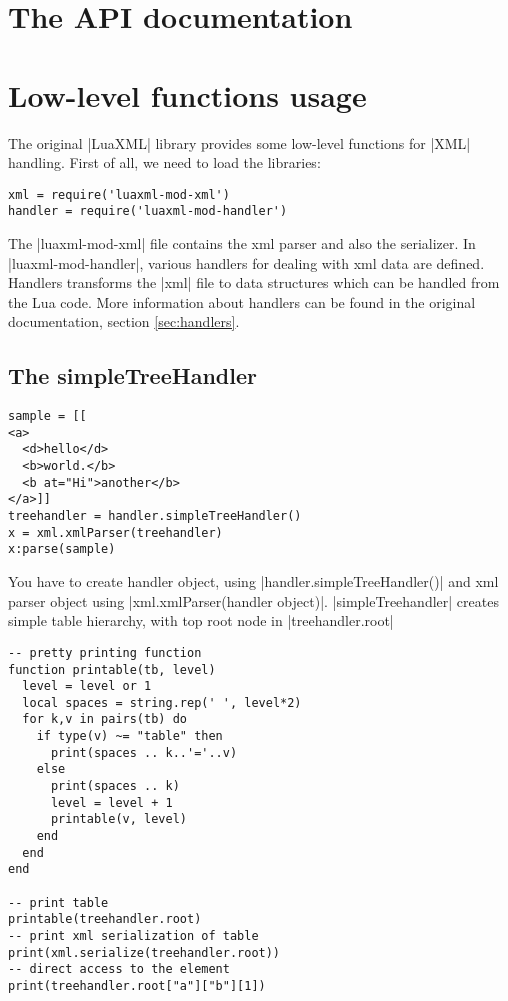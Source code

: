 \documentclass{ltxdoc}
\begin{document}
\clearpage
\section{The API documentation}




\section{Low-level functions usage}



The original |LuaXML| library provides some low-level functions for |XML| handling.
First of all, we need to load the libraries:

\begin{verbatim}
xml = require('luaxml-mod-xml')
handler = require('luaxml-mod-handler')
\end{verbatim} 


The |luaxml-mod-xml| file contains the  xml parser and also the serializer. In
|luaxml-mod-handler|, various handlers for dealing with xml data are defined.
Handlers transforms the |xml| file to data structures which can be handled from
the Lua code. More information about handlers can be found in the original
documentation, section \ref{sec:handlers}.

\subsection{The simpleTreeHandler} 
\begin{verbatim}
sample = [[
<a>
  <d>hello</d>
  <b>world.</b>
  <b at="Hi">another</b>
</a>]]
treehandler = handler.simpleTreeHandler()
x = xml.xmlParser(treehandler)
x:parse(sample)
\end{verbatim} 

You have to create handler object, using |handler.simpleTreeHandler()| and xml
parser object using |xml.xmlParser(handler object)|. |simpleTreehandler|
creates simple table hierarchy, with top root node in |treehandler.root|

\begin{verbatim}
-- pretty printing function
function printable(tb, level)
  level = level or 1
  local spaces = string.rep(' ', level*2)
  for k,v in pairs(tb) do
    if type(v) ~= "table" then
      print(spaces .. k..'='..v)
    else
      print(spaces .. k)
      level = level + 1
      printable(v, level)
    end
  end
end

-- print table
printable(treehandler.root)
-- print xml serialization of table
print(xml.serialize(treehandler.root))
-- direct access to the element
print(treehandler.root["a"]["b"][1])
\end{verbatim}
\end{document}
